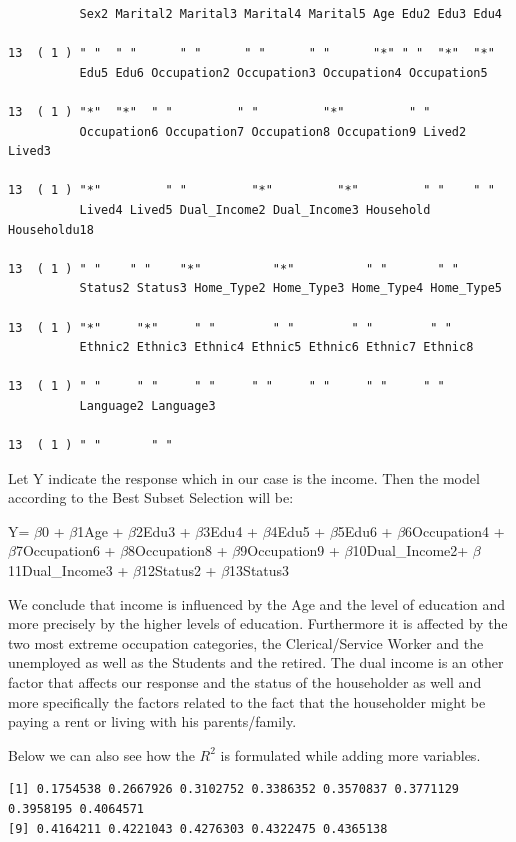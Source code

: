 \documentclass[11pt]{article}
\begin{document}
\begin{verbatim}
          Sex2 Marital2 Marital3 Marital4 Marital5 Age Edu2 Edu3 Edu4

13  ( 1 ) " "  " "      " "      " "      " "      "*" " "  "*"  "*" 
          Edu5 Edu6 Occupation2 Occupation3 Occupation4 Occupation5
      
13  ( 1 ) "*"  "*"  " "         " "         "*"         " "        
          Occupation6 Occupation7 Occupation8 Occupation9 Lived2 Lived3

13  ( 1 ) "*"         " "         "*"         "*"         " "    " "   
          Lived4 Lived5 Dual_Income2 Dual_Income3 Household Householdu18
      
13  ( 1 ) " "    " "    "*"          "*"          " "       " "         
          Status2 Status3 Home_Type2 Home_Type3 Home_Type4 Home_Type5
   
13  ( 1 ) "*"     "*"     " "        " "        " "        " "       
          Ethnic2 Ethnic3 Ethnic4 Ethnic5 Ethnic6 Ethnic7 Ethnic8
 
13  ( 1 ) " "     " "     " "     " "     " "     " "     " "    
          Language2 Language3
    
13  ( 1 ) " "       " " 
\end{verbatim}

Let Y indicate the response which in our case is the income. Then the model according to the Best Subset Selection will be:

Y= $\beta$0 + $\beta$1Age + $\beta$2Edu3 + $\beta$3Edu4 + $\beta$4Edu5 + $\beta$5Edu6 + $\beta$6Occupation4 + $\beta$7Occupation6 + $\beta$8Occupation8 + $\beta$9Occupation9 + $\beta$10Dual\_Income2+ $\beta$11Dual\_Income3 + $\beta$12Status2 + $\beta$13Status3

We conclude that income is influenced by the Age and the level of education and more precisely by the higher levels of education. Furthermore it is affected by the two most extreme occupation categories, the Clerical/Service Worker and the unemployed as well as the Students and the retired. The dual income is an other factor that affects our response and the status of the householder as well and more specifically the factors related to the fact that the householder might be paying a rent or living with his parents/family. 

Below we can also see how the $R^2$ is formulated while adding more variables.

\begin{verbatim}
[1] 0.1754538 0.2667926 0.3102752 0.3386352 0.3570837 0.3771129 0.3958195 0.4064571
[9] 0.4164211 0.4221043 0.4276303 0.4322475 0.4365138
 \end{verbatim}
 
\end{document}
